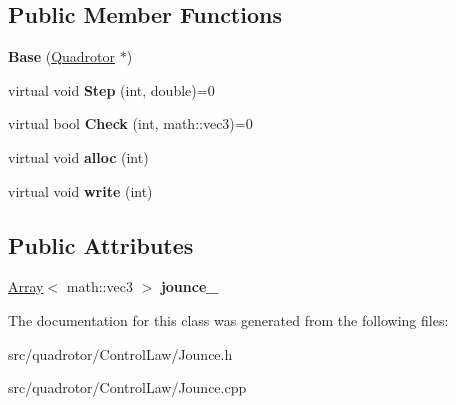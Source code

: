 \subsection*{\-Public \-Member \-Functions}
\begin{DoxyCompactItemize}
\item 
\hypertarget{classJounce_1_1Base_a8e926179f18af0343dc9d155281a3fef}{{\bfseries \-Base} (\hyperlink{classQuadrotor}{\-Quadrotor} $\ast$)}\label{classJounce_1_1Base_a8e926179f18af0343dc9d155281a3fef}

\item 
\hypertarget{classJounce_1_1Base_ab541df0d26f27f1ed36584b0d44d3b36}{virtual void {\bfseries \-Step} (int, double)=0}\label{classJounce_1_1Base_ab541df0d26f27f1ed36584b0d44d3b36}

\item 
\hypertarget{classJounce_1_1Base_aba9478612b6891ea4fed47d15d2f0db8}{virtual bool {\bfseries \-Check} (int, math\-::vec3)=0}\label{classJounce_1_1Base_aba9478612b6891ea4fed47d15d2f0db8}

\item 
\hypertarget{classJounce_1_1Base_a83e3ef78e81ff6f85c46cda167a35cfa}{virtual void {\bfseries alloc} (int)}\label{classJounce_1_1Base_a83e3ef78e81ff6f85c46cda167a35cfa}

\item 
\hypertarget{classJounce_1_1Base_afd1ad723f86beb0fde0e960b835a958a}{virtual void {\bfseries write} (int)}\label{classJounce_1_1Base_afd1ad723f86beb0fde0e960b835a958a}

\end{DoxyCompactItemize}
\subsection*{\-Public \-Attributes}
\begin{DoxyCompactItemize}
\item 
\hypertarget{classJounce_1_1Base_ae4a19256fe64afbceb80c2fdbe584404}{\hyperlink{classArray}{\-Array}$<$ math\-::vec3 $>$ {\bfseries jounce\-\_\-}}\label{classJounce_1_1Base_ae4a19256fe64afbceb80c2fdbe584404}

\end{DoxyCompactItemize}


\-The documentation for this class was generated from the following files\-:\begin{DoxyCompactItemize}
\item 
src/quadrotor/\-Control\-Law/\-Jounce.\-h\item 
src/quadrotor/\-Control\-Law/\-Jounce.\-cpp\end{DoxyCompactItemize}
